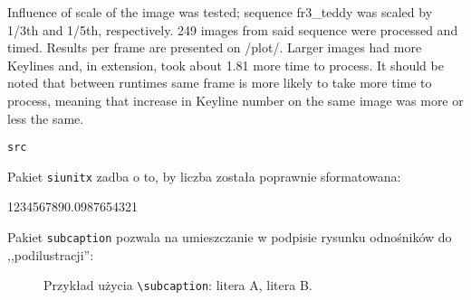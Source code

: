 


Influence of scale of the image was tested; sequence fr3\_teddy was scaled by 1/3th and 1/5th, respectively. 249 images from said sequence were processed and timed. Results per frame are presented on /plot/. Larger images had more Keylines and, in extension, took about 1.81 more time to process. It should be noted that between runtimes same frame is more likely to take more time to process, meaning that increase in Keyline number on the same image was more or less the same.








\begin{lstlisting}
src
\end{lstlisting}

Pakiet \texttt{siunitx} zadba o to, by liczba została poprawnie sformatowana: \\
\begin{center}
	\num{1234567890.0987654321}
\end{center}


Pakiet \texttt{subcaption} pozwala na umieszczanie w podpisie rysunku odnośników do ,,podilustracji'': \\

\begin{figure}[h]
	\centering
	\begin{subfigure}{0.35\textwidth}
		\centering
		\subcaption{\label{subfigure_a}}
	\end{subfigure}
	\begin{subfigure}{0.35\textwidth}
		\centering
		\subcaption{\label{subfigure_b}}
	\end{subfigure}
	
	\caption{\label{fig:subcaption_example}Przykład użycia \texttt{\textbackslash subcaption}: \protect{} litera A, \protect{} litera B.}
\end{figure}

